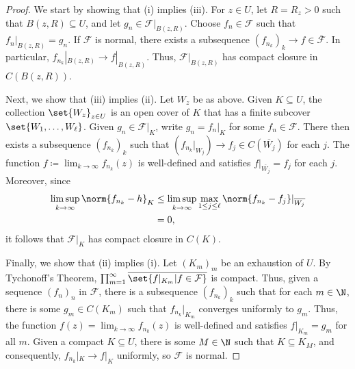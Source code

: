 \documentclass[10pt]{mypackage}
\renewcommand{\coloneq}{\coloneqq}
\begin{document}
\begin{proof}
  We start by showing that (i) implies (iii). For $z\in U$, let $R = R_z > 0$ such that $B\left( z,R \right)\subseteq U$, and let $g_n\in \mathcal{F}|_{ B\left( z,R \right) }$. Choose $f_n\in \mathcal{F}$ such that $f_n|_{ B\left( z,R \right) } = g_n$. If $\mathcal{F}$ is normal, there exists a subsequence $\left( f_{n_k} \right)_k\rightarrow f\in \overline{\mathcal{F}}$. In particular, $f_{n_k}|_{B\left( z,R \right)}\rightarrow f|_{B\left( z,R \right)}$. Thus, $\mathcal{F}|_{B\left( z,R \right)}$ has compact closure in $C\left( B\left( z,R \right) \right)$.%

  Next, we show that (iii) implies (ii). Let $W_z$ be as above. Given $K\subseteq U$, the collection $\set{W_z}_{z\in U}$ is an open cover of $K$ that has a finite subcover $\set{W_{1},\dots,W_{\ell}}$. Given $g_n\in \mathcal{F}|_{K}$, write $g_n = f_n|_{K}$ for some $f_n\in \mathcal{F}$. There then exists a subsequence $\left( f_{n_k} \right)_k$ such that $\left( f_{n_k}|_{W_{j}} \right)\rightarrow f_j\in C\left( \overline{W_j} \right)$ for each $j$. The function $f \coloneq \lim_{k\rightarrow\infty}f_{n_k}(z)$ is well-defined and satisfies $f|_{ \overline{W_{j}} } = f_j$ for each $j$. Moreover, since
  \begin{align*}
    \limsup_{k\rightarrow\infty}\norm{f_{n_k}-h}_{K} &\leq \limsup_{k\rightarrow\infty}\max_{1\leq j \leq \ell} \norm{f_{n_k} - f_j}|_{ \overline{W_j} }\\
                                                     &= 0,
  \end{align*}
  it follows that $\mathcal{F}|_{K}$ has compact closure in $C\left( K \right)$.%

  Finally, we show that (ii) implies (i). Let $\left( K_m \right)_m$ be an exhaustion of $U$. By Tychonoff's Theorem, $\prod_{m=1}^{\infty} \overline{\set{f|_{K_m} | f\in \mathcal{F}}}$ is compact. Thus, given a sequence $\left( f_n \right)_n$ in $\mathcal{F}$, there is a subsequence $\left( f_{n_k} \right)_k$ such that for each $m\in \N$, there is some $g_m\in C\left( K_m \right)$ such that $f_{n_k}|_{K_m}$ converges uniformly to $g_m$. Thus, the function $f(z) = \lim_{k\rightarrow\infty}f_{n_k}(z)$ is well-defined and satisfies $f|_{K_m} = g_m$ for all $m$. Given a compact $K\subseteq U$, there is some $M\in \N$ such that $K\subseteq K_M$, and consequently, $f_{n_k}|_{K}\rightarrow f|_{K}$ uniformly, so $\mathcal{F}$ is normal.
\end{proof}
\end{document}
